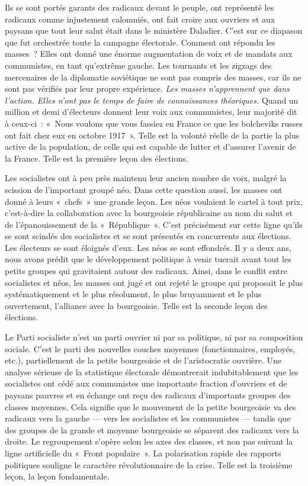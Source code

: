 \documentclass[french,twoside]{book} %
\begin{document}
Ils se sont portés garants des radicaux devant le peuple, ont représenté les radicaux comme injustement calomniés, ont fait croire aux ouvriers et aux paysans que tout leur salut était dans le ministère Daladier. C’est sur ce diapason que fut orchestrée toute la campagne électorale. Comment ont répondu les masses ? Elles ont donné une énorme augmentation de voix et de mandats aux communistes, en tant qu’extrême gauche. Les tournants et les zigzags des mercenaires de la diplomatie soviétique ne sont pas compris des masses, car ils ne sont pas vérifiés par leur propre expérience. \emph{Les masses n’apprennent que dans l’action. Elles n’ont pas le temps de faire de connaissances théoriques.} Quand un million et demi d’électeurs donnent leur voix aux communistes, leur majorité dit à ceux-ci : « Nous voulons que vous fassiez en France ce que les bolcheviks russes ont fait chez eux en octobre 1917 ». Telle est la volonté réelle de la partie la plus active de la population, de celle qui est capable de lutter et d’assurer l’avenir de la France. Telle est la première leçon des élections.\par
Les socialistes ont à peu près maintenu leur ancien nombre de voix, malgré la scission de l’important groupé néo. Dans cette question aussi, les masses ont donné à leurs « chefs » une grande leçon. Les néos voulaient le cartel à tout prix, c’est-à-dire la collaboration avec la bourgeoisie républicaine au nom du salut et de l’épanouissement de la « République ». C’est précisément sur cette ligne qu’ils se sont scindés des socialistes et se sont présentés en concurrents aux élections. Les électeurs se sont  éloignés d’eux. Les néos se sont effondrés. Il y a deux ans, nous avons prédit que le développement politique à venir tuerait avant tout les petits groupes qui gravitaient autour des radicaux. Ainsi, dans le conflit entre socialistes et néos, les masses ont jugé et ont rejeté le groupe qui proposait le plus systématiquement et le plus résolument, le plus bruyamment et le plus ouvertement, l’alliance avec la bourgeoisie. Telle est la seconde leçon des élections.\par
Le Parti socialiste n’est un parti ouvrier ni par sa politique, ni par sa composition sociale. C’est le parti des nouvelles couches moyennes (fonctionnaires, employés, etc.), partiellement de la petite bourgeoisie et de l’aristocratie ouvrière. Une analyse sérieuse de la statistique électorale démontrerait indubitablement que les socialistes ont cédé aux communistes une importante fraction d’ouvriers et de paysans pauvres et en échange ont reçu des radicaux d’importants groupes des classes moyennes. Cela signifie que le mouvement de la petite bourgeoisie va des radicaux vers la gauche — vers les socialistes et les communistes — tandis que des groupes de la grande et moyenne bourgeoisie se séparent des radicaux vers la droite. Le regroupement s’opère selon les axes des classes, et non pas suivant la ligne artificielle du « Front populaire ». La polarisation rapide des rapports politiques souligne le caractère révolutionnaire de la crise. Telle est la troisième leçon, la leçon fondamentale.\par
\end{document}
